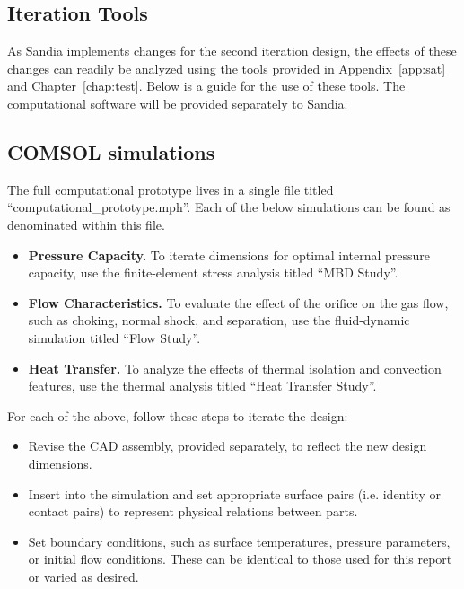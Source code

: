 \documentclass[12pt, letterpaper]{report}%
\newcounter{mycounter}           %
\newcounter{sub}[mycounter]      %
\begin{document}
\begin{appendices}
	\section{Iteration Tools}
	\label{app:iter:customize}

		As Sandia implements changes for the second iteration design, the effects of these changes can readily be analyzed using the tools provided in Appendix~\ref{app:sat} and Chapter~\ref{chap:test}.
		Below is a guide for the use of these tools. The computational software will be provided separately to Sandia.
		
		\subsection{COMSOL simulations}
		\label{app:iter:customize:COMSOL}

			The full computational prototype lives in a single file titled ``computational\_prototype.mph''. Each of the below simulations can be found as denominated within this file.

			\begin{itemize}
				\item \textbf{Pressure Capacity.} To iterate dimensions for optimal internal pressure capacity, use the finite-element stress analysis titled ``MBD Study''.
				\item \textbf{Flow Characteristics.} To evaluate the effect of the orifice on the gas flow, such as choking, normal shock, and separation, use the fluid-dynamic simulation titled ``Flow Study''.
				\item \textbf{Heat Transfer.} To analyze the effects of thermal isolation and convection features, use the thermal analysis titled ``Heat Transfer Study''.
			\end{itemize}

			For each of the above, follow these steps to iterate the design:

			\begin{itemize}
				\item Revise the CAD assembly, provided separately, to reflect the new design dimensions.
				\item Insert into the simulation and set appropriate surface pairs (i.e. identity or contact pairs) to represent physical relations between parts.
				\item Set boundary conditions, such as surface temperatures, pressure parameters, or initial flow conditions. These can be identical to those used for this report or varied as desired.
			\end{itemize}


\end{appendices}
\end{document}
